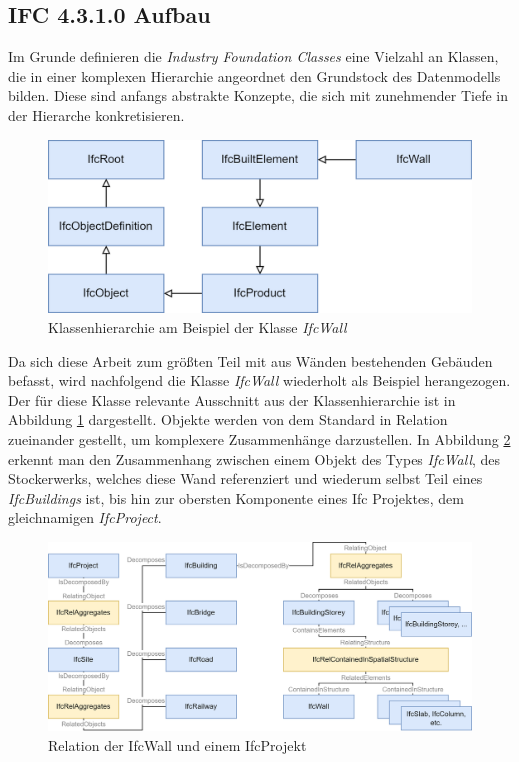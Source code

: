 \subsection{IFC 4.3.1.0 Aufbau}
Im Grunde definieren die \textit{Industry Foundation Classes} eine Vielzahl an Klassen, die in einer komplexen Hierarchie angeordnet den Grundstock des Datenmodells bilden.
Diese sind anfangs abstrakte Konzepte, die sich mit zunehmender Tiefe in der Hierarche konkretisieren.

\begin{figure}[ht]
    \centering
    \includegraphics[width=0.6\columnwidth]{fig/Hierarchie_IfcWall_300.drawio.png}
    \caption{Klassenhierarchie am Beispiel der Klasse \textit{IfcWall}}
    \label{fig:IfcWall_Hierarchie}
\end{figure}

Da sich diese Arbeit zum größten Teil mit aus Wänden bestehenden Gebäuden befasst, wird nachfolgend die Klasse \textit{IfcWall} wiederholt als Beispiel herangezogen.
Der für diese Klasse relevante Ausschnitt aus der Klassenhierarchie ist in Abbildung \ref{fig:IfcWall_Hierarchie} dargestellt.
Objekte werden von dem Standard in Relation zueinander gestellt, um komplexere Zusammenhänge darzustellen.
In Abbildung \ref{fig:IFC_Relationships} erkennt man den Zusammenhang zwischen einem Objekt des Types \textit{IfcWall}, des Stockerwerks, welches diese Wand referenziert und wiederum selbst Teil eines \textit{IfcBuildings} ist, bis hin zur obersten Komponente eines Ifc Projektes, dem gleichnamigen \textit{IfcProject}.

\begin{figure}[h]
    \centering
    \includegraphics[width=0.9\columnwidth]{fig/IFC_Relationships_300.drawio.png}
    \caption{Relation der IfcWall und einem IfcProjekt}
    \label{fig:IFC_Relationships}
\end{figure}

